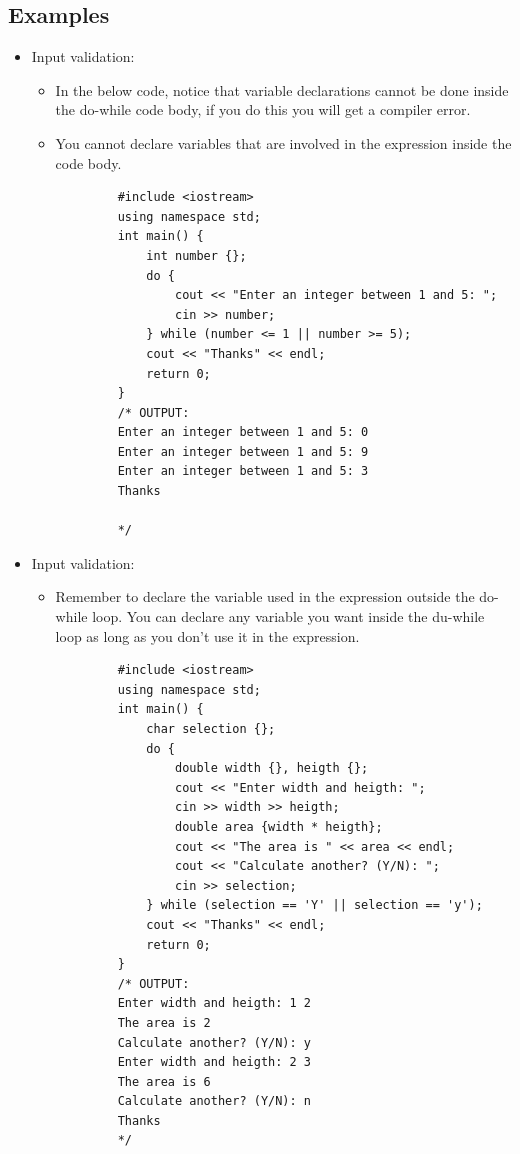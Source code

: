 \subsection{Examples}
\begin{itemize}
    \item Input validation:
        \begin{itemize}
            \item In the below code, notice that variable declarations cannot be done inside the do-while code body, if you do this you will get a compiler error. 
            \item You cannot declare variables that are involved in the expression inside the code body.
        \end{itemize}
        \begin{verbatim}
            #include <iostream>
            using namespace std;
            int main() {
                int number {};
                do {
                    cout << "Enter an integer between 1 and 5: ";
                    cin >> number;
                } while (number <= 1 || number >= 5);
                cout << "Thanks" << endl;
                return 0;
            }
            /* OUTPUT:
            Enter an integer between 1 and 5: 0
            Enter an integer between 1 and 5: 9
            Enter an integer between 1 and 5: 3
            Thanks

            */
        \end{verbatim}
    
    \item Input validation:
        \begin{itemize}
            \item Remember to declare the variable used in the expression outside the do-while loop. You can declare any variable you want inside the du-while loop as long as you don't use it in the expression.
        \end{itemize}
        \begin{verbatim}
            #include <iostream>
            using namespace std;
            int main() {
                char selection {};
                do {
                    double width {}, heigth {};
                    cout << "Enter width and heigth: ";
                    cin >> width >> heigth;
                    double area {width * heigth};
                    cout << "The area is " << area << endl;
                    cout << "Calculate another? (Y/N): ";
                    cin >> selection;
                } while (selection == 'Y' || selection == 'y');
                cout << "Thanks" << endl;
                return 0;
            }
            /* OUTPUT:
            Enter width and heigth: 1 2
            The area is 2
            Calculate another? (Y/N): y
            Enter width and heigth: 2 3
            The area is 6
            Calculate another? (Y/N): n
            Thanks
            */
        \end{verbatim}
\end{itemize}

